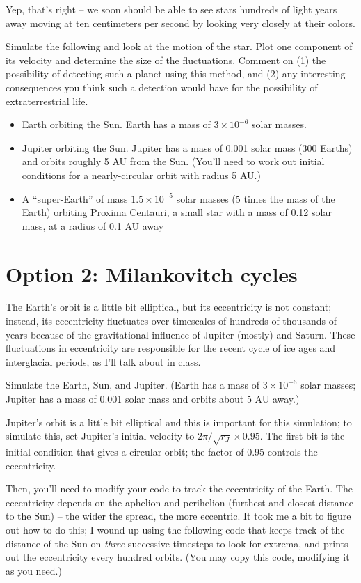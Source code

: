 \documentclass[12pt]{article}
\begin{document}
Yep, that's right -- we soon should be able to see stars hundreds of light years away moving at ten centimeters per second by looking very closely at their colors. 

Simulate the following and look at the motion of the star. Plot one component of its velocity and determine the size of the fluctuations. Comment on (1) the possibility of detecting such a planet using this method, and (2) any interesting consequences you think
such a detection would have for the possibility of extraterrestrial life.

\begin{itemize}
\item Earth orbiting the Sun. Earth has a mass of $3 \times 10^{-6}$ solar masses.
\item Jupiter orbiting the Sun. Jupiter has a mass of 0.001 solar mass (300 Earths) and orbits roughly 5 AU from the Sun. (You'll need to work out initial conditions for a nearly-circular orbit with radius 5 AU.)
\item A ``super-Earth'' of mass $1.5 \times 10^{-5}$ solar masses (5 times the mass of the Earth) orbiting Proxima Centauri, a small star with a mass of 0.12 solar mass, at a radius of 0.1 AU away
\end{itemize}

\section{Option 2: Milankovitch cycles}

The Earth's orbit is a little bit elliptical, but its eccentricity is not constant; instead, its eccentricity fluctuates over timescales of hundreds of thousands of years because of the gravitational influence of Jupiter (mostly) and Saturn.
These fluctuations in eccentricity are responsible for the recent cycle of ice ages and interglacial periods, as I'll talk about in class.

Simulate the Earth, Sun, and Jupiter. (Earth has a mass of $3 \times 10^{-6}$ solar masses; Jupiter has a mass of 0.001 solar mass and orbits about 5 AU away.)

Jupiter's orbit is a little bit elliptical and this is important for this simulation; to simulate this, set Jupiter's initial velocity to $2\pi / \sqrt{r_J} \times 0.95$. The first bit is the initial condition that gives a circular orbit; the factor of 0.95 
controls the eccentricity.

Then, you'll need to modify your code to track the eccentricity of the Earth. The eccentricity depends on the aphelion and perihelion (furthest and closest distance to the Sun) -- the wider the spread, the more eccentric. 
It took me a bit to figure out how to do this; I wound up using the following code that keeps track of the distance of the Sun on {\it three} successive timesteps to look for extrema, and prints out the eccentricity every
hundred orbits. (You may copy this code, modifying it as you need.)
\end{document}
